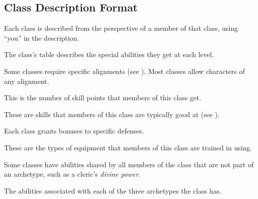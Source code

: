     \subsection{Class Description Format}
        Each class is described from the perspective of a member of that class, using ``you'' in the description.

        The class's table describes the special abilities they get at each level.

        Some classes require specific alignments (see ).
        Most classes allow characters of any alignment.

        This is the number of skill points that members of this class get.

        These are skills that members of this class are typically good at (see ).

        Each class grants bonuses to specific defenses.

        These are the types of equipment that members of this class are trained in using.

        Some classes have abilities shared by all members of the class that are not part of an archetype, such as a cleric's \textit{divine power}.

        The abilities associated with each of the three archetypes the class has.

